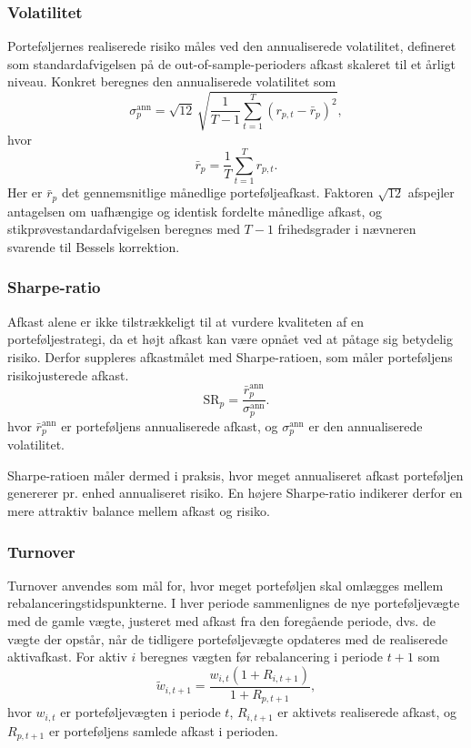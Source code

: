 \documentclass[../main.tex]{subfiles}
\begin{document}
\subsubsection{Volatilitet}
Porteføljernes realiserede risiko måles ved den annualiserede volatilitet, defineret som standardafvigelsen på de out-of-sample-perioders afkast skaleret til et årligt niveau. Konkret beregnes den annualiserede volatilitet som
\begin{equation}
\sigma_p^{\mathrm{ann}}
=
\sqrt{12}\,
\sqrt{
\frac{1}{T-1}
\sum_{t=1}^{T}
\left(r_{p,t}-\bar r_p\right)^2
},
\label{eq:vol}
\end{equation}
hvor
\begin{equation}
\bar r_p
=
\frac{1}{T}\sum_{t=1}^{T} r_{p,t}.
\label{eq:mean_return}
\end{equation}
Her er $\bar r_p$ det gennemsnitlige månedlige porteføljeafkast. Faktoren $\sqrt{12}$ afspejler antagelsen om uafhængige og identisk fordelte månedlige afkast, og stikprøvestandardafvigelsen beregnes med $T-1$ frihedsgrader i nævneren svarende til Bessels korrektion.

\subsubsection{Sharpe-ratio}
Afkast alene er ikke tilstrækkeligt til at vurdere kvaliteten af en porteføljestrategi, da et højt afkast kan være opnået ved at påtage sig betydelig risiko. Derfor suppleres afkastmålet med Sharpe-ratioen, som måler porteføljens risikojusterede afkast.
\begin{equation}
\mathrm{SR}_{p}
=
\frac{\bar{r}_{p}^{\mathrm{ann}}}{\sigma_{p}^{\mathrm{ann}}}.
\label{eq:sharpe_ratio_rf_zero}
\end{equation}
hvor $\bar{r}_{p}^{\mathrm{ann}}$ er porteføljens annualiserede afkast, og $\sigma_{p}^{\mathrm{ann}}$ er den annualiserede volatilitet.

Sharpe-ratioen måler dermed i praksis, hvor meget annualiseret afkast porteføljen genererer pr. enhed annualiseret risiko. En højere Sharpe-ratio indikerer derfor en mere attraktiv balance mellem afkast og risiko.


\subsubsection{Turnover}

Turnover anvendes som mål for, hvor meget porteføljen skal omlægges mellem rebalanceringstidspunkterne. I hver periode sammenlignes de nye porteføljevægte med de gamle vægte, justeret med afkast fra den foregående periode, dvs. de vægte der opstår, når de tidligere porteføljevægte opdateres med de realiserede aktivafkast. For aktiv $i$ beregnes vægten før rebalancering i periode $t+1$ som
\begin{equation}
\tilde{w}_{i,t+1}
=
\frac{w_{i,t}(1+R_{i,t+1})}{1+R_{p,t+1}},
\label{eq:drifted_weight}
\end{equation}
hvor $w_{i,t}$ er porteføljevægten i periode $t$, $R_{i,t+1}$ er aktivets realiserede afkast, og $R_{p,t+1}$ er porteføljens samlede afkast i perioden.
\end{document}
